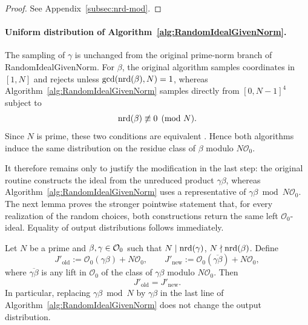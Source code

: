 \begin{proof}
See Appendix~\ref{subsec:nrd-mod}.
\end{proof}



\paragraph{Uniform distribution of Algorithm~\ref{alg:RandomIdealGivenNorm}.}
The sampling of $\gamma$ is unchanged from the original prime-norm branch of
\textsf{RandomIdealGivenNorm}. For $\beta$, the original algorithm samples
coordinates in $[1,N]$ and rejects unless $\gcd(\mathrm{nrd}(\beta),N)=1$, whereas
Algorithm~\ref{alg:RandomIdealGivenNorm} samples directly from
$[0,N-1]^4$ subject to
\[
\mathrm{nrd}(\beta)\not\equiv 0 \pmod N.
\]
Since $N$ is prime, these two conditions are equivalent
. Hence both algorithms induce the same distribution on the residue class of
$\beta$ modulo $N\mathcal O_0$.

It therefore remains only to justify the modification in the last step:
the original routine constructs the ideal from the unreduced product
$\gamma\beta$, whereas Algorithm~\ref{alg:RandomIdealGivenNorm} uses a
representative of $\gamma\beta \bmod N\mathcal O_0$. The next lemma proves
the stronger pointwise statement that, for every realization of the random
choices, both constructions return the same left $\mathcal O_0$-ideal.
Equality of output distributions follows immediately.

\begin{lemma}
\label{lem:RandomIdealGivenNorm-distribution}
Let $N$ be a prime and $\beta,\gamma \in \mathcal{O}_0$ such that $N \mid \mathrm{nrd}(\gamma)$, $N \nmid \mathrm{nrd}(\beta)$.
Define
\[
J'_{\mathrm{old}}:=\mathcal O_0(\gamma\beta)+N\mathcal O_0,
\qquad
J'_{\mathrm{new}}:=\mathcal O_0(\overline{\gamma\beta})+N\mathcal O_0,
\]
where $\overline{\gamma\beta}$ is any lift in $\mathcal O_0$ of the class of
$\gamma\beta$ modulo $N\mathcal O_0$.
Then
\[
J'_{\mathrm{old}}=J'_{\mathrm{new}}.
\]
In particular, replacing $\gamma\beta \bmod N$ by $\gamma\beta$ in the last line of
Algorithm~\ref{alg:RandomIdealGivenNorm} does not change the output distribution.
\end{lemma}

